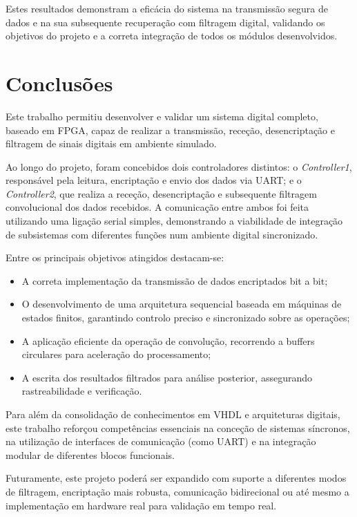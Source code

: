 \documentclass[12pt, a4paper]{article}
\begin{document}
Estes resultados demonstram a eficácia do sistema na transmissão segura de dados e na sua subsequente recuperação com filtragem digital, validando os objetivos do projeto e a correta integração de todos os módulos desenvolvidos.


\newpage

\section{Conclusões}

Este trabalho permitiu desenvolver e validar um sistema digital completo, baseado em FPGA, capaz de realizar a transmissão, receção, desencriptação e filtragem de sinais digitais em ambiente simulado.

Ao longo do projeto, foram concebidos dois controladores distintos: o \textit{Controller1}, responsável pela leitura, encriptação e envio dos dados via UART; e o \textit{Controller2}, que realiza a receção, desencriptação e subsequente filtragem convolucional dos dados recebidos. A comunicação entre ambos foi feita utilizando uma ligação serial simples, demonstrando a viabilidade de integração de subsistemas com diferentes funções num ambiente digital sincronizado.

Entre os principais objetivos atingidos destacam-se:
\begin{itemize}
    \item A correta implementação da transmissão de dados encriptados bit a bit;
    \item O desenvolvimento de uma arquitetura sequencial baseada em máquinas de estados finitos, garantindo controlo preciso e sincronizado sobre as operações;
    \item A aplicação eficiente da operação de convolução, recorrendo a buffers circulares para aceleração do processamento;
    \item A escrita dos resultados filtrados para análise posterior, assegurando rastreabilidade e verificação.
\end{itemize}

Para além da consolidação de conhecimentos em VHDL e arquiteturas digitais, este trabalho reforçou competências essenciais na conceção de sistemas síncronos, na utilização de interfaces de comunicação (como UART) e na integração modular de diferentes blocos funcionais.

Futuramente, este projeto poderá ser expandido com suporte a diferentes modos de filtragem, encriptação mais robusta, comunicação bidirecional ou até mesmo a implementação em hardware real para validação em tempo real.

\newpage
\end{document}
